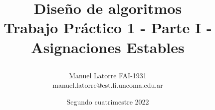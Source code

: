 \titlepage

\title{\textbf{Diseño de algoritmos}\\
\large{\textbf{Trabajo Práctico 1 - Parte I - Asignaciones Estables}}
\author{
Manuel Latorre FAI-1931\\ manuel.latorre@est.fi.uncoma.edu.ar\vspace{3mm}\\
}}
\date{Segundo cuatrimestre 2022}

\maketitle
\vspace{25mm}
\vfill
{}

\thispagestyle{empty}
\titlepage
\newpage
\tableofcontents %
\newpage
\pagestyle{plain}
\thispagestyle{plain}
\pagebreak